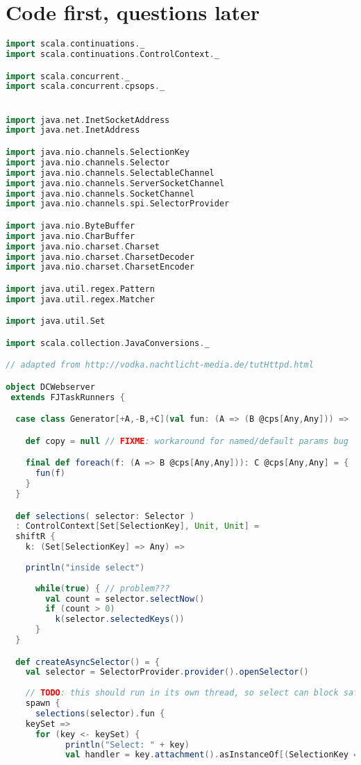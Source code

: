 \section{Code first, questions later}

\begin{lstlisting}[language=Scala]
import scala.continuations._
import scala.continuations.ControlContext._

import scala.concurrent._
import scala.concurrent.cpsops._


import java.net.InetSocketAddress
import java.net.InetAddress

import java.nio.channels.SelectionKey
import java.nio.channels.Selector
import java.nio.channels.SelectableChannel
import java.nio.channels.ServerSocketChannel
import java.nio.channels.SocketChannel
import java.nio.channels.spi.SelectorProvider

import java.nio.ByteBuffer
import java.nio.CharBuffer
import java.nio.charset.Charset
import java.nio.charset.CharsetDecoder
import java.nio.charset.CharsetEncoder

import java.util.regex.Pattern
import java.util.regex.Matcher

import java.util.Set

import scala.collection.JavaConversions._

// adapted from http://vodka.nachtlicht-media.de/tutHttpd.html

object DCWebserver
 extends FJTaskRunners {

  case class Generator[+A,-B,+C](val fun: (A => (B @cps[Any,Any])) => (C @cps[Any,Any])) {

    def copy = null // FIXME: workaround for named/default params bug

    final def foreach(f: (A => B @cps[Any,Any])): C @cps[Any,Any] = {
      fun(f)
    }
  }

  def selections( selector: Selector )
  : ControlContext[Set[SelectionKey], Unit, Unit] = 
  shiftR {
    k: (Set[SelectionKey] => Any) =>
      
    println("inside select")
	  
      while(true) { // problem???
        val count = selector.selectNow()
        if (count > 0)
          k(selector.selectedKeys())
      }
  }

  def createAsyncSelector() = {
    val selector = SelectorProvider.provider().openSelector()
	
    // TODO: this should run in its own thread, so select can block safely
    spawn {
      selections(selector).fun {
	keySet =>
  	  for (key <- keySet) {
    	    println("Select: " + key)	  
    	    val handler = key.attachment().asInstanceOf[(SelectionKey => Any)]
  	    

\end{lstlisting}
